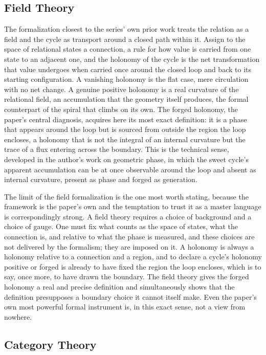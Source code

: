 \subsection{Field Theory}

The formalization closest to the series' own prior work treats the relation as a field and the cycle as transport around a closed path within it. Assign to the space of relational states a connection, a rule for how value is carried from one state to an adjacent one, and the holonomy of the cycle is the net transformation that value undergoes when carried once around the closed loop and back to its starting configuration. A vanishing holonomy is the flat case, mere circulation with no net change. A genuine positive holonomy is a real curvature of the relational field, an accumulation that the geometry itself produces, the formal counterpart of the spiral that climbs on its own. The forged holonomy, the paper's central diagnosis, acquires here its most exact definition: it is a phase that appears around the loop but is sourced from outside the region the loop encloses, a holonomy that is not the integral of an internal curvature but the trace of a flux entering across the boundary. This is the technical sense, developed in the author's work on geometric phase, in which the sweet cycle's apparent accumulation can be at once observable around the loop and absent as internal curvature, present as phase and forged as generation.

The limit of the field formalization is the one most worth stating, because the framework is the paper's own and the temptation to trust it as a master language is correspondingly strong. A field theory requires a choice of background and a choice of gauge. One must fix what counts as the space of states, what the connection is, and relative to what the phase is measured, and these choices are not delivered by the formalism; they are imposed on it. A holonomy is always a holonomy relative to a connection and a region, and to declare a cycle's holonomy positive or forged is already to have fixed the region the loop encloses, which is to say, once more, to have drawn the boundary. The field theory gives the forged holonomy a real and precise definition and simultaneously shows that the definition presupposes a boundary choice it cannot itself make. Even the paper's own most powerful formal instrument is, in this exact sense, not a view from nowhere.

\subsection{Category Theory}

